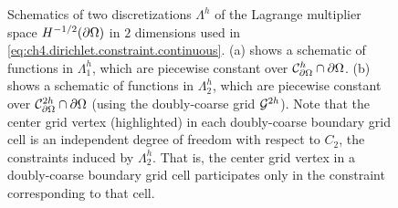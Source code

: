 \setlength{\figureheight}{0.40\columnwidth}
\begin{figure}[htbp]
\begin{center}
\caption{Schematics of two discretizations $\Lambda^h$ of the Lagrange multiplier space $H^{-1/2}(\partial\Omega)$ in $2$ dimensions used in \eqref{eq:ch4.dirichlet.constraint.continuous}. (a) shows a schematic of functions in $\Lambda^h_1$, which are piecewise constant over $\mathcal{C}^h_{\partial\Omega} \cap \partial\Omega$. (b) shows a schematic of functions in $\Lambda^h_2$, which are piecewise constant over $\mathcal{C}^{2h}_{\partial\Omega} \cap \partial\Omega$ (using the doubly-coarse grid $\mathcal{G}^{2h}$). Note that the center grid vertex (highlighted) in each doubly-coarse boundary grid cell is an independent degree of freedom with respect to $C_2$, the constraints induced by $\Lambda^h_2$. That is, the center grid vertex in a doubly-coarse boundary grid cell participates only in the constraint corresponding to that cell.}
\label{fig:ch4.lambdah}
\end{center}
\end{figure}

